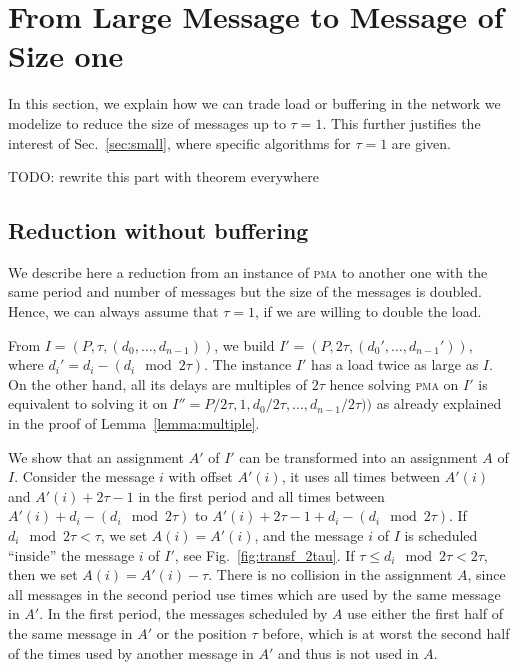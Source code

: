 \documentclass[a4paper,UKenglish,cleveref, autoref, thm-restate]{lipics-v2019}
\newcommand\pma{\textsc{pma}\xspace}
\newcommand{\todo}[1]{{\color{red} TODO: {#1}}}
\begin{document}
\section{From Large Message to Message of Size one}\label{sec:reduction}

In this section, we explain how we can trade load or buffering in the network we modelize 
to reduce the size of messages up to $\tau = 1$. This further justifies the interest of Sec.~\ref{sec:small},
where specific algorithms for $\tau = 1$ are given.

\todo{rewrite this part with theorem everywhere}


\subsection{Reduction without buffering}

We describe here a reduction from an instance of \pma to another one with the same period and number of messages but 
the size of the messages is doubled. Hence, we can always assume that $\tau = 1$, if we are willing to double the load.

From $I = (P,\tau,(d_{0},\dots,d_{n-1}))$, we build $I' = (P, 2\tau, (d_{0}',\dots,d_{n-1}'))$, where $d_i' = d_{i} - (d_{i} \mod 2\tau)$. The instance $I'$ has a load twice as large as $I$.
On the other hand, all its delays are multiples of $2\tau$ hence solving \pma on $I'$ is equivalent to solving it on $I'' = P/2\tau, 1,d_{0}/ 2\tau,\dots,d_{n-1} /2\tau))$ as already explained in the proof of Lemma~\ref{lemma:multiple}. 

We show that an assignment $A'$ of $I'$ can be transformed into an assignment $A$ of $I$. 
Consider the message $i$ with offset $A'(i)$, it uses all times between $A'(i)$ and $A'(i) + 2\tau -1$ in the first period and all times between $A'(i) + d_{i} - (d_{i} \mod 2\tau)$ to $A'(i) + 2\tau -1+ d_{i} - (d_{i} \mod 2\tau)$. 
If $d_{i} \mod 2\tau < \tau $, we set $A(i) = A'(i)$, and the message $i$ of $I$ is scheduled ``inside'' the 
message $i$ of $I'$, see Fig.~\ref{fig:transf_2tau}. If $\tau \leq d_{i} \mod 2\tau < 2\tau$, then we set 
$A(i) = A'(i) - \tau$. There is no collision in the assignment $A$, since all messages in the second period use
times which are used by the same message in $A'$. In the first period, the messages scheduled by $A$ use either the first
half of the same message in $A'$ or the position $\tau$ before, which is at worst the second half of the times used by another message in $A'$ and thus is not used in $A$.
\end{document}
